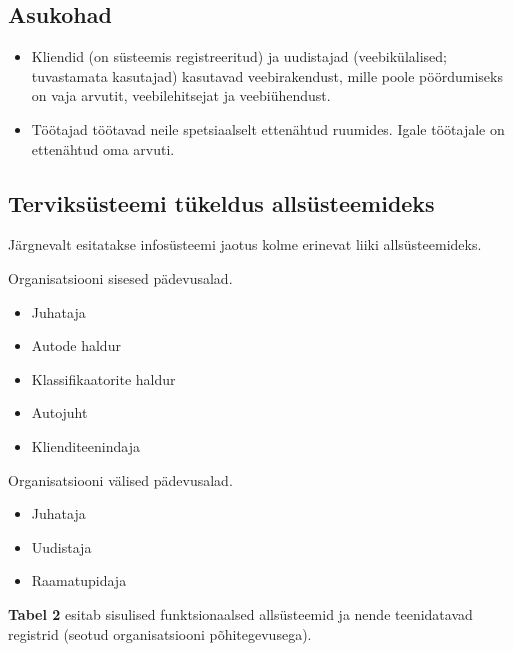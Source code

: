 \subsection{Asukohad}
\begin{itemize}
	\item Kliendid (on süsteemis registreeritud) ja uudistajad (veebikülalised; tuvastamata kasutajad) kasutavad veebirakendust, mille poole pöördumiseks on vaja arvutit, veebilehitsejat ja veebiühendust.
	\item Töötajad töötavad neile spetsiaalselt ettenähtud ruumides. Igale töötajale on ettenähtud oma arvuti. 
\end{itemize}

\subsection{Terviksüsteemi tükeldus allsüsteemideks}
Järgnevalt esitatakse infosüsteemi jaotus kolme erinevat liiki allsüsteemideks.
\\
\par
Organisatsiooni sisesed pädevusalad.
\begin{itemize}
	\item Juhataja
	\item Autode haldur
	\item Klassifikaatorite haldur
	\item Autojuht
	\item Klienditeenindaja
\end{itemize}

Organisatsiooni välised pädevusalad.
\begin{itemize}
	\item Juhataja
	\item Uudistaja
	\item Raamatupidaja
\end{itemize}

\textbf{Tabel 2} esitab sisulised funktsionaalsed allsüsteemid ja nende teenidatavad registrid (seotud organisatsiooni põhitegevusega). %

